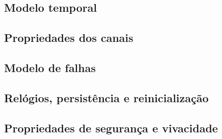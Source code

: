 \subsection{Modelo temporal}

\subsection{Propriedades dos canais}

\subsection{Modelo de falhas}

\subsection{Relógios, persistência e reinicialização}

\subsection{Propriedades de segurança e vivacidade}

